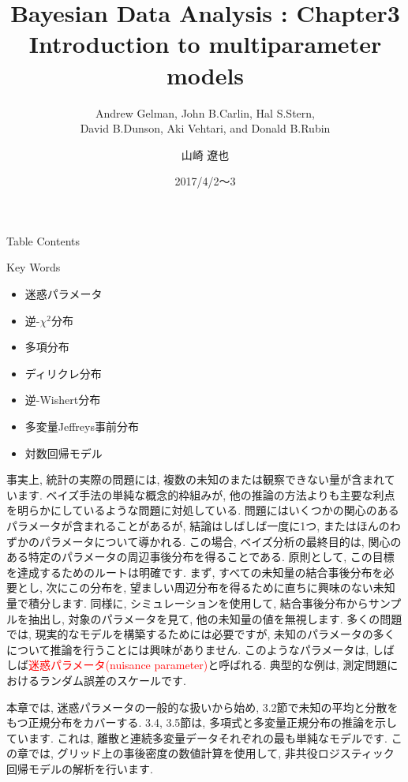 \documentclass[10pt,dvipdfmx,a4]{beamer}
\title{Bayesian Data Analysis : Chapter3 \\Introduction to multiparameter models}
\subtitle{Andrew Gelman, John B.Carlin, Hal S.Stern,\\David B.Dunson, Aki Vehtari, and Donald B.Rubin}
\author{山崎 遼也}
\institute{情報学科 数理工学コース 4回}
\date{2017/4/2～3}
\newcommand{\tcr}[1]{\textcolor{red}{#1}}
\begin{document}
\frame{\titlepage}

\begin{frame}{Table Contents}
\begin{multicols}{2}
{\scriptsize \tableofcontents}
\end{multicols}
\end{frame}

\begin{frame}{Key Words}
\begin{multicols}{2}
{\scriptsize \begin{itemize}
\item 迷惑パラメータ
\item 逆-$\chi^2$分布
\item 多項分布
\item ディリクレ分布
\item 逆-Wishert分布
\item 多変量Jeffreys事前分布
\item 対数回帰モデル
\end{itemize}}
\end{multicols}
\end{frame}


\begin{frame}
事実上, 統計の実際の問題には, 複数の未知のまたは観察できない量が含まれています.
ベイズ手法の単純な概念的枠組みが, 他の推論の方法よりも主要な利点を明らかにしているような問題に対処している.
問題にはいくつかの関心のあるパラメータが含まれることがあるが, 結論はしばしば一度に1つ, またはほんのわずかのパラメータについて導かれる.
この場合, ベイズ分析の最終目的は, 関心のある特定のパラメータの周辺事後分布を得ることである.
原則として, この目標を達成するためのルートは明確です.
まず, すべての未知量の結合事後分布を必要とし, 次にこの分布を, 望ましい周辺分布を得るために直ちに興味のない未知量で積分します.
同様に, シミュレーションを使用して, 結合事後分布からサンプルを抽出し, 対象のパラメータを見て, 他の未知量の値を無視します.
多くの問題では, 現実的なモデルを構築するためには必要ですが, 未知のパラメータの多くについて推論を行うことには興味がありません.
このようなパラメータは, しばしば\tcr{迷惑パラメータ(nuisance parameter)}と呼ばれる.
典型的な例は, 測定問題におけるランダム誤差のスケールです.

本章では, 迷惑パラメータの一般的な扱いから始め, 3.2節で未知の平均と分散をもつ正規分布をカバーする.
3.4, 3.5節は, 多項式と多変量正規分布の推論を示しています.
これは, 離散と連続多変量データそれぞれの最も単純なモデルです.
この章では, グリッド上の事後密度の数値計算を使用して, 非共役ロジスティック回帰モデルの解析を行います.
\end{frame}
\end{document}
